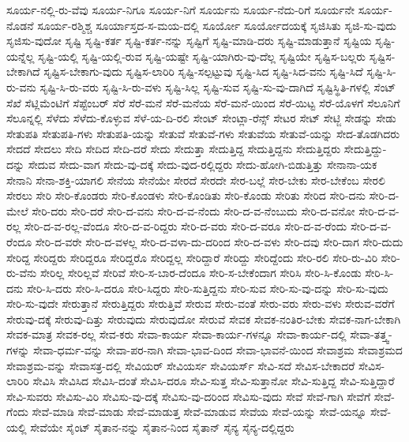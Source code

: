 {ಸೂರ್ಯ-ನಲ್ಲಿ-ರು-ವೆವು
ಸೂರ್ಯ-ನಿಗೂ
ಸೂರ್ಯ-ನಿಗೆ
ಸೂರ್ಯನು
ಸೂರ್ಯ-ನೆದು-ರಿಗೆ
ಸೂರ್ಯನೇ
ಸೂರ್ಯ-ನೊಡನೆ
ಸೂರ್ಯ-ರಶ್ಮಿಶ್ಚ
ಸೂರ್ಯಾಸ್ತದ-ಸ-ಮಯ-ದಲ್ಲಿ
ಸೂರ್ಯೋ
ಸೂರ್ಯೋದಯಕ್ಕೆ
ಸೃಜಿಸಿತು
ಸೃಜಿ-ಸು-ವುದು
ಸೃಜಿಸು-ವುದೋ
ಸೃಷ್ಟಿ
ಸೃಷ್ಟಿ-ಕರ್ತ
ಸೃಷ್ಟಿ-ಕರ್ತ-ನನ್ನು
ಸೃಷ್ಟಿಗೆ
ಸೃಷ್ಟಿ-ಮಾಡಿ-ದರು
ಸೃಷ್ಟಿ-ಮಾಡುತ್ತಾನೆ
ಸೃಷ್ಟಿಯ
ಸೃಷ್ಟಿ-ಯನ್ನೆಲ್ಲ
ಸೃಷ್ಟಿ-ಯಲ್ಲಿ
ಸೃಷ್ಟಿ-ಯಲ್ಲಿ-ರುವ
ಸೃಷ್ಟಿ-ಯಷ್ಟೇ
ಸೃಷ್ಟಿ-ಯಾಗಿರು-ವು-ದೆಲ್ಲ
ಸೃಷ್ಟಿಯೇ
ಸೃಷ್ಟಿಸ-ಬಲ್ಲರು
ಸೃಷ್ಟಿಸ-ಬೇಕಾಗಿದೆ
ಸೃಷ್ಟಿಸ-ಬೇಕಾಗು-ವುದು
ಸೃಷ್ಟಿಸ-ಲಾರಿರಿ
ಸೃಷ್ಟಿ-ಸಲ್ಪಟ್ಟುವು
ಸೃಷ್ಟಿ-ಸಿದ
ಸೃಷ್ಟಿ-ಸಿದ-ವನು
ಸೃಷ್ಟಿ-ಸಿದೆ
ಸೃಷ್ಟಿ-ಸಿ-ರು-ವನು
ಸೃಷ್ಟಿ-ಸಿ-ರು-ವರು
ಸೃಷ್ಟಿ-ಸಿ-ರು-ವಳು
ಸೃಷ್ಟಿ-ಸಿಲ್ಲ
ಸೃಷ್ಟಿ-ಸುವ
ಸೃಷ್ಟಿ-ಸು-ವು-ದಾಗಿದೆ
ಸೃಷ್ಟಿಸ್ಥಿತಿ-ಗಳಲ್ಲಿ
ಸೆಂಟ್
ಸೆಖೆ
ಸೆಟ್ಲಿಮೆಂಟಿಗೆ
ಸೆಪ್ಟೆಂಬರ್
ಸೆರೆ
ಸೆರೆ-ಮನೆ
ಸೆರೆ-ಮನೆಯ
ಸೆರೆ-ಮನೆ-ಯಿಂದ
ಸೆರೆ-ಯಿಟ್ಟ
ಸೆರೆ-ಯೊಳಗೆ
ಸೆಲೂನಿಗೆ
ಸೆಲೂನ್ನಲ್ಲಿ
ಸೆಳೆದು
ಸೆಳೆದು-ಕೊಳ್ಳುವ
ಸೆಳೆ-ಯ-ದಿ-ರಲಿ
ಸೇಂಟ್
ಸೇಂಟ್ಲಾ-ರೆನ್ಸ್
ಸೇಟರ
ಸೇಟ್
ಸೇಟ್ಜಿ
ಸೇಡನ್ನು
ಸೇಡು
ಸೇತುಪತಿ
ಸೇತುಪತಿ-ಗಳು
ಸೇತುಪತಿ-ಯನ್ನು
ಸೇತುವೆ
ಸೇತುವೆ-ಗಳು
ಸೇತುವೆಯ
ಸೇತುವೆ-ಯನ್ನು
ಸೇದ-ತೊಡಗಿದರು
ಸೇದದೆ
ಸೇದಲು
ಸೇದಿ
ಸೇದಿದ
ಸೇದಿ-ದರೆ
ಸೇದು
ಸೇದುತ್ತಾ
ಸೇದುತ್ತಿದ್ದ
ಸೇದುತ್ತಿದ್ದನು
ಸೇದುತ್ತಿದ್ದರು
ಸೇದುತ್ತಿದ್ದು-ದನ್ನು
ಸೇದುವ
ಸೇದು-ವಾಗ
ಸೇದು-ವು-ದಕ್ಕೆ
ಸೇದು-ವುದ-ರಲ್ಲಿದ್ದರು
ಸೇದು-ಹೋಗಿ-ಬಿಡುತ್ತಿತ್ತು
ಸೇನಾನಾ-ಯಕ
ಸೇನಾನಿ
ಸೇನಾ-ಶಕ್ತಿ-ಯಾಗಲಿ
ಸೇನೆಯ
ಸೇನೆಯೇ
ಸೇರದೆ
ಸೇರದೇ
ಸೇರ-ಬಲ್ಲೆ
ಸೇರ-ಬೇಕು
ಸೇರ-ಬೇಕೆಂಬ
ಸೇರಲಿ
ಸೇರಲು
ಸೇರಿ
ಸೇರಿ-ಕೊಂಡರು
ಸೇರಿ-ಕೊಂಡಳು
ಸೇರಿ-ಕೊಂಡಿತು
ಸೇರಿ-ಕೊಂಡು
ಸೇರಿತು
ಸೇರಿದ
ಸೇರಿ-ದನು
ಸೇರಿ-ದ-ಮೇಲೆ
ಸೇರಿ-ದರು
ಸೇರಿ-ದರೆ
ಸೇರಿ-ದ-ವನು
ಸೇರಿ-ದ-ವ-ನೆಂದು
ಸೇರಿ-ದ-ವ-ನೆಂಬುದು
ಸೇರಿ-ದ-ವನೋ
ಸೇರಿ-ದ-ವ-ರಲ್ಲ
ಸೇರಿ-ದ-ವ-ರಲ್ಲ-ವೆಂದೂ
ಸೇರಿ-ದ-ವ-ರಿದ್ದರು
ಸೇರಿ-ದ-ವರು
ಸೇರಿ-ದ-ವರೂ
ಸೇರಿ-ದ-ವ-ರೆಂದು
ಸೇರಿ-ದ-ವ-ರೆಂದೂ
ಸೇರಿ-ದ-ವರೇ
ಸೇರಿ-ದ-ವಳಲ್ಲ
ಸೇರಿ-ದ-ವಳಾ-ದು-ದರಿಂದ
ಸೇರಿ-ದ-ವಳು
ಸೇರಿ-ದವು
ಸೇರಿ-ದಾಗ
ಸೇರಿ-ದುದು
ಸೇರಿದ್ದ
ಸೇರಿದ್ದರು
ಸೇರಿದ್ದರೂ
ಸೇರಿದ್ದರೊ
ಸೇರಿದ್ದಲ್ಲ
ಸೇರಿದ್ದಾರೆ
ಸೇರಿದ್ದು
ಸೇರಿದ್ದೆಂದು
ಸೇರಿ-ರಲಿ
ಸೇರಿ-ರು-ವಿರಿ
ಸೇರಿ-ರು-ವೆನು
ಸೇರಿಲ್ಲ
ಸೇರಿಲ್ಲವೆ
ಸೇರಿವೆ
ಸೇರಿ-ಸ-ಬಾರ-ದೆಂದೂ
ಸೇರಿ-ಸ-ಬೇಕೆಂದಾಗ
ಸೇರಿಸಿ
ಸೇರಿ-ಸಿ-ಕೊಂಡು
ಸೇರಿ-ಸಿ-ದನು
ಸೇರಿ-ಸಿ-ದರು
ಸೇರಿ-ಸಿ-ದರೂ
ಸೇರಿ-ಸಿದ್ದರು
ಸೇರಿ-ಸುತ್ತಿದ್ದನು
ಸೇರಿ-ಸುವ
ಸೇರಿ-ಸು-ವು-ದನ್ನು
ಸೇರಿ-ಸು-ವುದು
ಸೇರಿ-ಸು-ವುದೇ
ಸೇರುತ್ತಾನೆ
ಸೇರುತ್ತಿದ್ದರು
ಸೇರುತ್ತಿವೆ
ಸೇರುವ
ಸೇರು-ವಂತೆ
ಸೇರು-ವರು
ಸೇರು-ವಳು
ಸೇರುವ-ವರೆಗೆ
ಸೇರುವು-ದಕ್ಕೆ
ಸೇರುವು-ದಿತ್ತು
ಸೇರುವುದು
ಸೇರುವುದೋ
ಸೇರುವೆ
ಸೇವಕ
ಸೇವಕ-ನಂತಿರ-ಬೇಕು
ಸೇವಕ-ನಾಗ-ಬೇಕಾಗಿ
ಸೇವಕ-ಮಾತ್ರ
ಸೇವಕ-ರಲ್ಲ
ಸೇವ-ಕರು
ಸೇವಾ-ಕಾರ್ಯ
ಸೇವಾ-ಕಾರ್ಯ-ಗಳನ್ನೂ
ಸೇವಾ-ಕಾರ್ಯ-ದಲ್ಲಿ
ಸೇವಾ-ತತ್ತ್ವ-ಗಳನ್ನು
ಸೇವಾ-ಧರ್ಮ-ವನ್ನು
ಸೇವಾ-ಪರ-ನಾಗಿ
ಸೇವಾ-ಭಾವ-ದಿಂದ
ಸೇವಾ-ಭಾವನೆ-ಯಿಂದ
ಸೇವಾಶ್ರಮ
ಸೇವಾಶ್ರಮದ
ಸೇವಾಶ್ರಮ-ವನ್ನು
ಸೇವಾಸತ್ರ-ದಲ್ಲಿ
ಸೇವಿಯರ್
ಸೇವಿಯರ್ಸ
ಸೇವಿಯರ್ಸ್
ಸೇವಿ-ಸದೆ
ಸೇವಿಸ-ಬೇಕಾದರೆ
ಸೇವಿಸ-ಲಾರಿರಿ
ಸೇವಿಸಿ
ಸೇವಿಸಿದ
ಸೇವಿಸಿ-ದಂತೆ
ಸೇವಿಸಿ-ದರೂ
ಸೇವಿ-ಸುತ್ತ
ಸೇವಿ-ಸುತ್ತಾನೋ
ಸೇವಿ-ಸುತ್ತಿದ್ದ
ಸೇವಿ-ಸುತ್ತಿದ್ದಾರೆ
ಸೇವಿ-ಸುವರು
ಸೇವಿಸು-ವಿರಿ
ಸೇವಿಸು-ವು-ದಕ್ಕೆ
ಸೇವಿಸು-ವು-ದರಿಂದ
ಸೇವಿಸು-ವುದು
ಸೇವೆ
ಸೇವೆ-ಗಾಗಿ
ಸೇವೆಗೆ
ಸೇವೆ-ಗೆಂದು
ಸೇವೆ-ಮಾಡಿ
ಸೇವೆ-ಮಾಡು
ಸೇವೆ-ಮಾಡುತ್ತ
ಸೇವೆ-ಮಾಡುವ
ಸೇವೆಯ
ಸೇವೆ-ಯನ್ನು
ಸೇವೆ-ಯನ್ನೂ
ಸೇವೆ-ಯಲ್ಲಿ
ಸೇವೆಯೇ
ಸೈಂಟ್
ಸೈತಾನ-ನನ್ನು
ಸೈತಾನ-ನಿಂದ
ಸೈತಾನ್
ಸೈನ್ಯ
ಸೈನ್ಯ-ದಲ್ಲಿದ್ದರು
}
